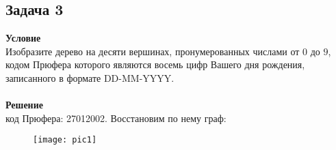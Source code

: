 	
	
	\newpage
	\subsection*{Задача 3}
	\noindent
	\textbf{Условие}\\
	Изобразите дерево на десяти вершинах, пронумерованных числами от $0$ до $9$, кодом Прюфера которого являются восемь цифр Вашего дня рождения, записанного в формате DD-MM-YYYY.\\
	\\
	\textbf{Решение}\\
	код Прюфера: 27012002. Восстановим по нему граф:
	\begin{figure}[h!]
		\center\texttt{[image: pic1]}
	\end{figure}
	
	